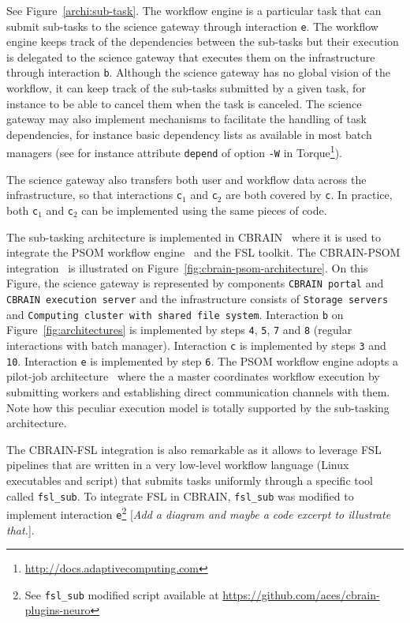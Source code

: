 \documentclass[preprint,3p,twocolumn]{elsarticle}
\newcommand{\todo}[1]{\color{blue}\xspace[\emph{#1}]\xspace\color{black}}
\begin{document}
See Figure~\ref{archi:sub-task}. The workflow engine is a particular
task that can submit sub-tasks to the science gateway through
interaction \texttt{e}. The workflow engine keeps track of the
dependencies between the sub-tasks but their execution is delegated to
the science gateway that executes them on the infrastructure through
interaction \texttt{b}. Although the science gateway has no global
vision of the workflow, it can keep track of the sub-tasks submitted
by a given task, for instance to be able to cancel them when the task
is canceled. The science gateway may also implement mechanisms to
facilitate the handling of task dependencies, for instance basic
dependency lists as available in most batch managers (see for instance
attribute \texttt{depend} of option \texttt{-W} in
Torque\footnote{\url{http://docs.adaptivecomputing.com}}).

The science gateway also transfers both user and workflow data across
the infrastructure, so that interactions \texttt{c$_1$} and
\texttt{c$_2$} are both covered by \texttt{c}. In practice, both
\texttt{c$_1$} and \texttt{c$_2$} can be implemented using the same
pieces of code.

The sub-tasking architecture is implemented in CBRAIN~\cite{SHER-14}
where it is used to integrate the PSOM workflow
engine~\cite{bellec2012pipeline} and the FSL toolkit. The CBRAIN-PSOM
integration~\cite{GLAT-16} is illustrated on
Figure~\ref{fig:cbrain-psom-architecture}. On this Figure, the science
gateway is represented by components \texttt{CBRAIN portal} and
\texttt{CBRAIN execution server} and the infrastructure consists of
\texttt{Storage servers} and \texttt{Computing cluster with shared
  file system}. Interaction \texttt{b} on
Figure~\ref{fig:architectures} is implemented by steps \texttt{4},
\texttt{5}, \texttt{7} and \texttt{8} (regular interactions with batch
manager). Interaction \texttt{c} is implemented by steps \texttt{3}
and \texttt{10}. Interaction \texttt{e} is implemented by step
\texttt{6}. The PSOM workflow engine adopts a pilot-job
architecture~\cite{turilli2015comprehensive} where the a master
coordinates workflow execution by submitting workers and establishing
direct communication channels with them. Note how this peculiar
execution model is totally supported by the sub-tasking architecture.

The CBRAIN-FSL integration is also remarkable as it allows to leverage
FSL pipelines that are written in a very low-level workflow language
(Linux executables and script) that submits tasks uniformly through a
specific tool called \texttt{fsl\_sub}. To integrate FSL in CBRAIN,
\texttt{fsl\_sub} was modified to implement interaction
\texttt{e}\footnote{See \texttt{fsl\_sub} modified script available at
  \url{https://github.com/aces/cbrain-plugins-neuro}} \todo{Add a
  diagram and maybe a code excerpt to illustrate that.}.
\end{document}
